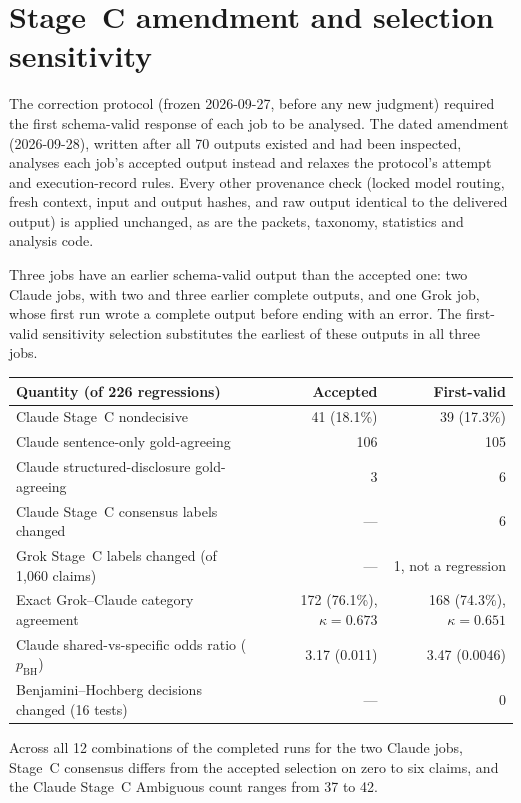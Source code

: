 \appendix
\section{Stage~C amendment and selection sensitivity}
\label{app:amendment}

The correction protocol (frozen 2026-09-27, before any new judgment) required the first schema-valid response of each job to be analysed.
The dated amendment (2026-09-28), written after all 70 outputs existed and had been inspected, analyses each job's accepted output instead and relaxes the protocol's attempt and execution-record rules.
Every other provenance check (locked model routing, fresh context, input and output hashes, and raw output identical to the delivered output) is applied unchanged, as are the packets, taxonomy, statistics and analysis code.

Three jobs have an earlier schema-valid output than the accepted one: two Claude jobs, with two and three earlier complete outputs, and one Grok job, whose first run wrote a complete output before ending with an error.
The first-valid sensitivity selection substitutes the earliest of these outputs in all three jobs.

\begin{center}
\small
\begin{tabular}{lrr}
\toprule
Quantity (of 226 regressions) & Accepted & First-valid \\
\midrule
Claude Stage~C nondecisive & 41 (18.1\%) & 39 (17.3\%) \\
Claude sentence-only gold-agreeing & 106 & 105 \\
Claude structured-disclosure gold-agreeing & 3 & 6 \\
Claude Stage~C consensus labels changed & --- & 6 \\
Grok Stage~C labels changed (of 1{,}060 claims) & --- & 1, not a regression \\
Exact Grok--Claude category agreement & 172 (76.1\%), $\kappa=0.673$ & 168 (74.3\%), $\kappa=0.651$ \\
Claude shared-vs-specific odds ratio ($p_{\mathrm{BH}}$) & 3.17 (0.011) & 3.47 (0.0046) \\
Benjamini--Hochberg decisions changed (16 tests) & --- & 0 \\
\bottomrule
\end{tabular}
\end{center}

Across all 12 combinations of the completed runs for the two Claude jobs, Stage~C consensus differs from the accepted selection on zero to six claims, and the Claude Stage~C Ambiguous count ranges from 37 to 42.

